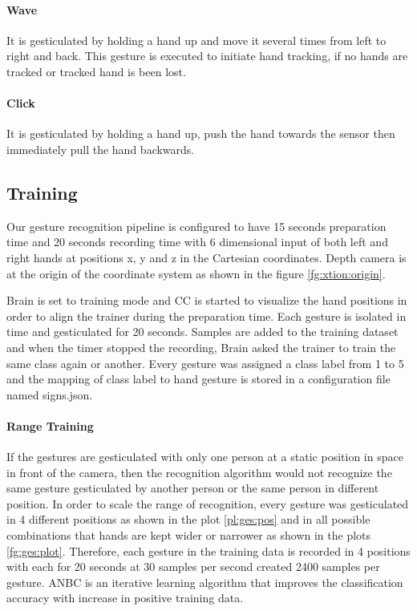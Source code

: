 \paragraph*{Wave} It is gesticulated by holding a hand up and move it several times from left to right and back. This gesture is executed to initiate hand tracking, if no hands are tracked or tracked hand is been lost.

\paragraph*{Click} It is gesticulated by holding a hand up, push the hand towards the sensor then immediately pull the hand backwards. 

\subsection{Training}
Our gesture recognition pipeline is configured to have 15 seconds preparation time and 20 seconds recording time with 6 dimensional input of both left and right hands at positions x, y and z in the Cartesian coordinates. Depth camera is at the origin of the coordinate system as shown in the figure \ref{fg:xtion:origin}.



Brain is set to training mode and CC is started to visualize the hand positions in order to align the trainer during the preparation time. Each gesture is isolated in time and gesticulated for 20 seconds. Samples are added to the training dataset and when the timer stopped the recording, Brain asked the trainer to train the same class again or another. Every gesture was assigned a class label from 1 to 5 and the mapping of class label to hand gesture is stored in a configuration file named signs.json. 

\paragraph*{Range Training} If the gestures are gesticulated with only one person at a static position in space in front of the camera, then the recognition algorithm would not recognize the same gesture gesticulated by another person or the same person in different position. In order to scale the range of recognition, every gesture was gesticulated in 4 different positions as shown in the plot \ref{pl:ges:pos} and in all possible combinations that hands are kept wider or narrower as shown in the plots \ref{fg:ges:plot}. Therefore, each gesture in the training data is recorded in 4 positions with each for 20 seconds at 30 samples per second created 2400 samples per gesture. ANBC is an iterative learning algorithm that improves the classification accuracy with increase in positive training data. 

